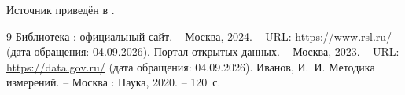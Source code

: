 Источник приведён в \cite{site}.

\begin{thebibliography}{9}
   Библиотека : официальный сайт. – Москва, 2024. –
  URL: https://www.rsl.ru/ (дата обращения: 04.09.2026).
   Портал открытых данных. – Москва, 2023. –
  URL: \url{https://data.gov.ru/} (дата обращения: 04.09.2026).
   Иванов, И.~И. Методика измерений. – Москва : Наука, 2020. – 120~с.
\end{thebibliography}

